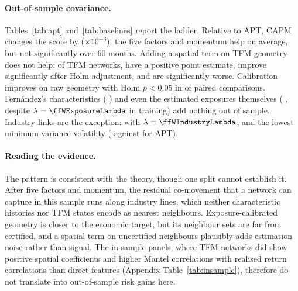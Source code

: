 \documentclass[letterpaper]{article} %
\theoremstyle{definition}
\begin{document}
\paragraph{Out-of-sample covariance.} Tables~\ref{tab:apt}
and~\ref{tab:baselines} report the ladder. Relative to APT, CAPM changes the
score by \ffWCapmGain{} \ffWCapmCi{} ($\times10^{-3}$): the five factors and
momentum help on average, but not significantly over 60 months.
Adding a spatial term on TFM geometry does not help: of \ffWFmSpatialCount{}
TFM networks, \ffWFmBetterPoint{} have a positive point estimate,
\ffWFmBetterHolm{} improve significantly after Holm adjustment, and
\ffWFmWorseHolm{} are significantly worse. Calibration improves on raw
geometry with Holm $p<0.05$ in \ffWCalOverRawBetterHolm{} of
\ffWCalOverRawCount{} paired comparisons. Fern\'andez's characteristics
(\ffWCharacteristicsGain{} \ffWCharacteristicsCi) and even the estimated
exposures themselves (\ffWExposureGain{} \ffWExposureCi, despite
$\lambda=\ffWExposureLambda$ in training) add nothing out of sample. Industry
links are the exception: \ffWIndustryGain{} \ffWIndustryCi{} with
$\lambda=\ffWIndustryLambda$, and the lowest minimum-variance volatility
(\ffWIndustryGmv{} against \ffWAptGmv{} for APT).

\paragraph{Reading the evidence.} The pattern is consistent with the theory,
though one split cannot establish it. After five factors and momentum, the
residual co-movement that a network can capture in this sample runs along
industry lines, which neither characteristic histories nor TFM states encode as
nearest neighbours. Exposure-calibrated geometry is closer to the economic
target, but its neighbour sets are far from certified, and a spatial term on
uncertified neighbours plausibly adds estimation noise rather than signal. The
in-sample panels, where TFM networks did show positive spatial coefficients
and higher Mantel correlations with realised return correlations than direct
features (Appendix Table~\ref{tab:insample}), therefore do not translate into
out-of-sample risk gains here.
\end{document}

